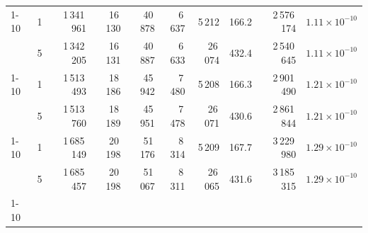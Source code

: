 \begin{tabular}{llrrrrrrrr}
\cline{1-10}
\multirow[t]{2}{*}{400} & 1 & 1\,341\,961 & 16\,130 & 40\,878 & 6\,637 & 5\,212 & 166.2 & 2\,576\,174 & $1.11\!\times\!10^{-10}$ \\
 & 5 & 1\,342\,205 & 16\,131 & 40\,887 & 6\,633 & 26\,074 & 432.4 & 2\,540\,645 & $1.11\!\times\!10^{-10}$ \\
\cline{1-10}
\multirow[t]{2}{*}{450} & 1 & 1\,513\,493 & 18\,186 & 45\,942 & 7\,480 & 5\,208 & 166.3 & 2\,901\,490 & $1.21\!\times\!10^{-10}$ \\
 & 5 & 1\,513\,760 & 18\,189 & 45\,951 & 7\,478 & 26\,071 & 430.6 & 2\,861\,844 & $1.21\!\times\!10^{-10}$ \\
\cline{1-10}
\multirow[t]{2}{*}{500} & 1 & 1\,685\,149 & 20\,198 & 51\,176 & 8\,314 & 5\,209 & 167.7 & 3\,229\,980 & $1.29\!\times\!10^{-10}$ \\
 & 5 & 1\,685\,457 & 20\,198 & 51\,067 & 8\,311 & 26\,065 & 431.6 & 3\,185\,315 & $1.29\!\times\!10^{-10}$ \\
\cline{1-10}
\bottomrule
\end{tabular}
